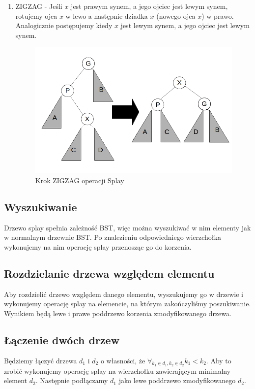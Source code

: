 \documentclass[declaration,shortabstract]{iithesis}
\theoremstyle{thm}
\theoremstyle{remark}
\theoremstyle{plain}
\theoremstyle{plain}
\theoremstyle{plain}
\begin{document}
\begin{enumerate}
\item{ZIGZAG - Jeśli $x$ jest prawym synem, a jego ojciec jest lewym synem, rotujemy ojca $x$ w lewo a następnie dziadka $x$ (nowego ojca $x$) w prawo. Analogicznie postępujemy kiedy $x$  jest lewym synem, a jego ojciec jest lewym synem.\\ 
\begin{figure}[H] 
\centering    
\includegraphics[scale = 0.3]{zigzag.png}  
\caption{Krok ZIGZAG operacji Splay}  
\label{fig:zigzag} 
\end{figure}} 
\end{enumerate}    

\subsection{Wyszukiwanie}
Drzewo splay spełnia zależność BST, więc można wyszukiwać w nim elementy jak w normalnym drzewnie BST. Po znalezieniu odpowiedniego wierzchołka wykonujemy na nim operację splay przenosząc go do korzenia.  

\subsection{Rozdzielanie drzewa względem elementu} 
Aby rozdzielić drzewo względem danego elementu, wyszukujemy go w drzewie i wykonujemy operację splay na elemencie, na którym zakończyliśmy poszukiwanie. Wynikiem będą lewe i prawe poddrzewo korzenia zmodyfikowanego drzewa.  

\subsection{Łączenie dwóch drzew} 
Będziemy łączyć drzewa \(d_1\) i \( d_2\) o własności, że \(\forall_{k_1 \in d_1, k_2 \in d_2} k_1 < k_2\). Aby to zrobić wykonujemy operację splay na wierzchołku zawierającym minimalny element \(d_2\). Następnie podłączamy \(d_1\) jako lewe poddrzewo zmodyfikowanego \(d_2\).  
\end{document}
